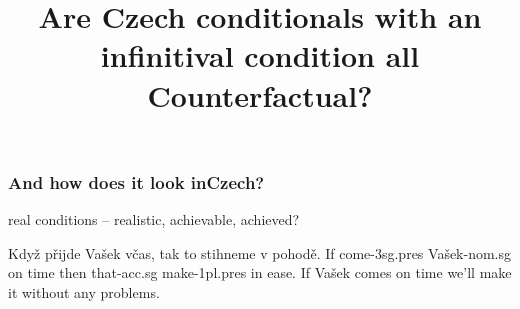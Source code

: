 \documentclass{beamer}
\title{Are Czech conditionals with an infinitival condition all Counterfactual?}
\def\glosstr{}
\newenvironment{linggloss}[2][]{
        \def\glosstr{\glt #1}%
        \gll #2}
{\glosstr\glend}}{}
\begin{document}
\maketitle

\begin{frame}[fragile]
    \frametitle{And how does it look inCzech?}
    \begin{covexamples}
        \item real conditions – realistic, achievable, achieved?
        \item \begin{linggloss}[If Vašek comes on time we'll make it without any problems.]
            Když přijde        Vašek        včas,   tak  to          stihneme      v  pohodě.
            If   come-3sg.pres Vašek-nom.sg on time then that-acc.sg make-1pl.pres in ease.
        \end{linggloss}
    \end{covexamples}
\end{frame}
\end{document}
